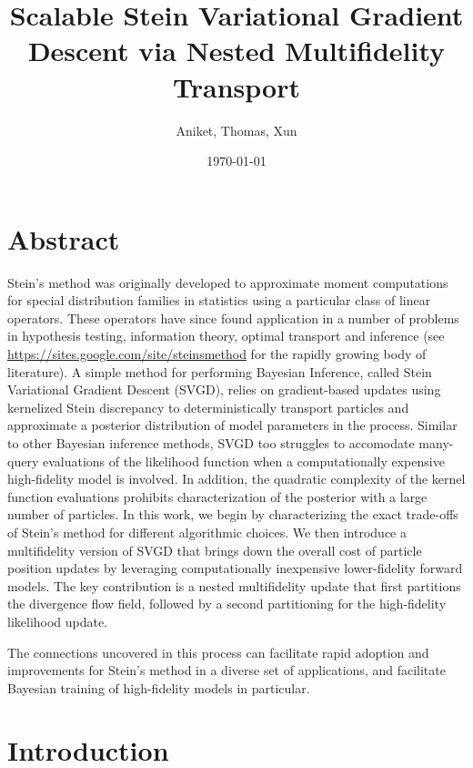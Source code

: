 \documentclass[12pt]{article}
\title{Scalable Stein Variational Gradient Descent via Nested Multifidelity Transport}
\author{Aniket, Thomas, Xun}
\date{\today}
\renewcommand{\[}{\left[}
\renewcommand{\]}{\right]}
\renewcommand{\(}{\left(}
\renewcommand{\)}{\right)}
\begin{document}
\maketitle
\section*{Abstract}
Stein's method was originally developed to approximate moment computations for special distribution families in statistics using a particular class of linear operators.
These operators have since found application in a number of problems in hypothesis testing, information theory, optimal transport and inference (see \url{https://sites.google.com/site/steinsmethod} for the rapidly growing body of literature). 
A simple method for performing Bayesian Inference, called Stein Variational Gradient Descent (SVGD), relies on gradient-based updates using kernelized Stein discrepancy to deterministically transport particles and approximate a posterior distribution of model parameters in the process. 
Similar to other Bayesian inference methods, SVGD too struggles to accomodate many-query evaluations of the likelihood function when a computationally expensive high-fidelity model is involved. In addition, the quadratic complexity of the kernel function evaluations prohibits characterization of the posterior with a large number of particles.
In this work, we begin by characterizing the exact trade-offs of Stein's method for different algorithmic choices. 
We then introduce a multifidelity version of SVGD that brings down the overall cost of particle position updates by leveraging computationally inexpensive lower-fidelity forward models. The key contribution is a nested multifidelity update that first partitions the divergence flow field, followed by a second partitioning for the high-fidelity likelihood update.

The connections uncovered in this process can facilitate rapid adoption and improvements for Stein's method in a diverse set of applications, and facilitate Bayesian training of high-fidelity models in particular.



\section{Introduction}
\end{document}

